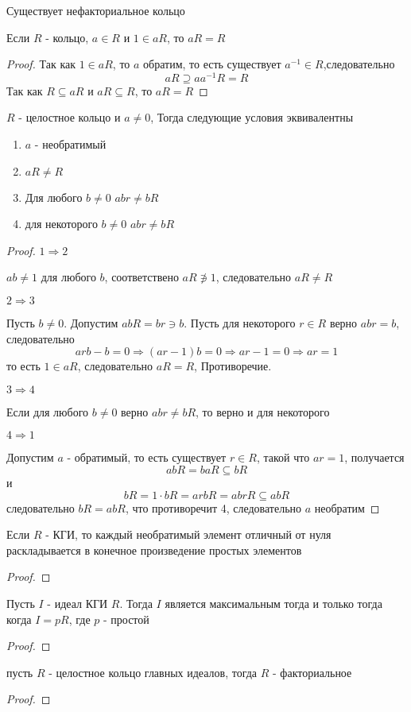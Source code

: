 \documentclass[../main/document.tex]{subfiles}
\begin{document}
\begin{thm}
Существует нефакториальное кольцо
\end{thm}
\begin{lemma}
Если $R$ - кольцо, $a\in R$ и $1\in aR$, то $aR=R$
\begin{proof}
Так как $1\in aR$, то $a$ обратим, то есть существует $a^{-1}\in R$,следовательно
$$aR\supseteq aa^{-1}R= R$$
Так как $R\subseteq aR$ и $aR\subseteq R$, то $aR=R$
\end{proof}
\end{lemma}
\begin{thm}
$R$ - целостное кольцо и $a\neq 0$, Тогда следующие условия эквивалентны
\begin{enumerate}
\item $a$ - необратимый
\item $aR\neq R$
\item Для любого $b\neq 0$ $abr\neq bR$
\item для некоторого $b\neq 0$ $abr\neq bR$
\end{enumerate}
\begin{proof}

$1\Rightarrow 2$

$ab\neq 1$ для любого $b$, соответствено $aR\not\ni 1$, следовательно $aR\neq R$

$2\Rightarrow 3$

Пусть $b\neq 0$. Допустим $abR=br\ni b$. Пусть для некоторого $r\in R$ верно $abr=b$, следовательно
$$arb-b=0\Rightarrow (ar-1)b=0\Rightarrow ar-1=0\Rightarrow ar=1$$
то есть $1\in aR$, следовательно $aR=R$, Противоречие.

$3\Rightarrow 4$

Если для любого  $b\neq 0$ верно $abr\neq bR$, то верно и для некоторого

$4\Rightarrow 1$

Допустим $a$ - обратимый, то есть существует $r\in R$, такой что $ar=1$, получается
$$abR=baR\subseteq bR$$
и
$$bR=1\cdot bR=arbR=abrR\subseteq abR$$
следовательно $bR=abR$, что противоречит 4, следовательно $a$ необратим
\end{proof}
\end{thm}
\begin{thm}
Если $R$ - КГИ, то каждый необратимый элемент отличный от нуля раскладывается в конечное произведение простых элементов
\begin{proof}

\end{proof}
\end{thm}
\begin{lemma}
Пусть $I$ - идеал КГИ $R$. Тогда $I$ является максимальным тогда и только тогда когда $I=pR$, где $p$ - простой
\begin{proof}

\end{proof}
\end{lemma}

\begin{thm}
пусть $R$ - целостное кольцо главных идеалов, тогда $R$ - факториальное
\begin{proof}

\end{proof}
\end{thm}
\end{document}
